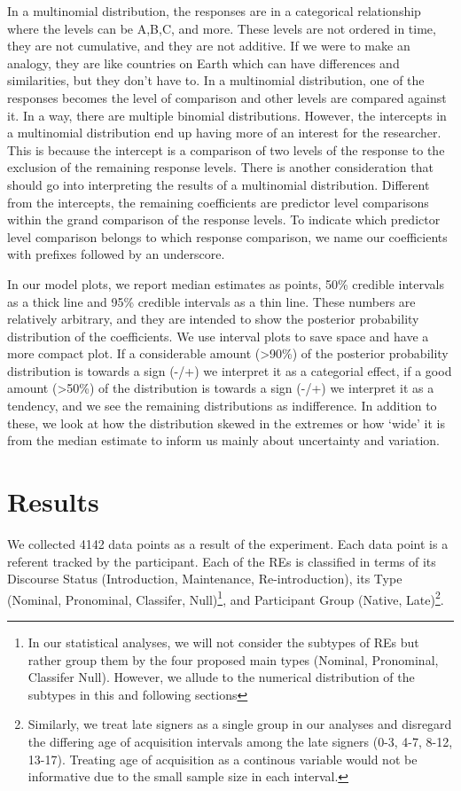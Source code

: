 \documentclass[review]{elsarticle} %
\begin{document}
In a multinomial distribution, the responses are in a categorical
relationship where the levels can be A,B,C, and more. These levels are
not ordered in time, they are not cumulative, and they are not additive.
If we were to make an analogy, they are like countries on Earth which
can have differences and similarities, but they don't have to. In a
multinomial distribution, one of the responses becomes the level of
comparison and other levels are compared against it. In a way, there are
multiple binomial distributions. However, the intercepts in a
multinomial distribution end up having more of an interest for the
researcher. This is because the intercept is a comparison of two levels
of the response to the exclusion of the remaining response levels. There
is another consideration that should go into interpreting the results of
a multinomial distribution. Different from the intercepts, the remaining
coefficients are predictor level comparisons within the grand comparison
of the response levels. To indicate which predictor level comparison
belongs to which response comparison, we name our coefficients with
prefixes followed by an underscore.

In our model plots, we report median estimates as points, 50\% credible
intervals as a thick line and 95\% credible intervals as a thin line.
These numbers are relatively arbitrary, and they are intended to show
the posterior probability distribution of the coefficients. We use
interval plots to save space and have a more compact plot. If a
considerable amount (\textgreater90\%) of the posterior probability
distribution is towards a sign (-/+) we interpret it as a categorial
effect, if a good amount (\textgreater50\%) of the distribution is
towards a sign (-/+) we interpret it as a tendency, and we see the
remaining distributions as indifference. In addition to these, we look
at how the distribution skewed in the extremes or how `wide' it is from
the median estimate to inform us mainly about uncertainty and variation.

\hypertarget{results}{%
\section{Results}\label{results}}

We collected 4142 data points as a result of the experiment. Each data
point is a referent tracked by the participant. Each of the REs is
classified in terms of its Discourse Status (Introduction, Maintenance,
Re-introduction), its Type (Nominal, Pronominal, Classifer,
Null)\footnote{In our statistical analyses, we will not consider the subtypes of REs but rather group them by the four proposed main types (Nominal, Pronominal, Classifer Null). However, we allude to the numerical distribution of the subtypes in this and following sections},
and Participant Group (Native,
Late)\footnote{Similarly, we treat late signers as a single group in our analyses and disregard the differing age of acquisition intervals among the late signers (0-3, 4-7, 8-12, 13-17). Treating age of acquisition as a continous variable would not be informative due to the small sample size in each interval.}.
\end{document}
